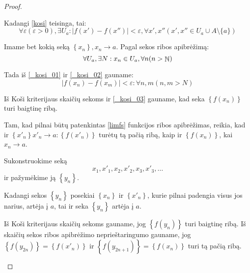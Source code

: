 \begin{prop}
\begin{proof}
\begin{description}
        Kadangi \ref{kosi} teisinga, tai:
        \begin{equation}
          \forall \varepsilon (\varepsilon > 0), \exists U_{a} :
          | f(x') - f(x'') | < \varepsilon, \forall x',x''
          (x',x'' \in U_{a} \cup A \setminus \{a\})
          \label{_kosi_01}
        \end{equation}

        Imame bet kokią seką $\left\{ x_{n} \right\}, x_{n} \to a$. Pagal
        sekos ribos apibrėžimą:
        \begin{equation}
          \forall U_{a}, \exists N : x_{n} \in U_{a}, \forall n (n > \mathop{\mathbb{N}})
          \label{_kosi_02}
        \end{equation}

        Tada iš \ref{_kosi_01} ir \ref{_kosi_02} gauname:
        \begin{equation}
          | f(x_{n}) - f(x_{m}) | < \varepsilon : \forall n, m (n,m > N)
          \label{_kosi_03}
        \end{equation}

        Iš Koši kriterijaus skaičių sekoms ir \ref{_kosi_03} gauname, kad
        seka $\left\{ f(x_{n}) \right\}$ turi baigtinę ribą.

        Tam, kad pilnai būtų patenkintas \ref{limfs} funkcijos ribos 
        apibrėžimas, reikia, kad ir 
        $\left\{ x'_{n} \right\} x'_{n} \to a : \left\{ f(x'_{n}) \right\}$
        turėtų tą pačią ribą, kaip ir $\left\{ f(x_{n}) \right\}$, 
        kai $x_{n} \to a$.

        Sukonstruokime seką
        \begin{equation*}
          x_{1},x'_{1},x_{2},x'_{2},x_{3},x'_{3},\ldots
        \end{equation*}
        ir pažymėkime ją $\left\{ y_{n} \right\}$.

        Kadangi sekos $\left\{ y_{n} \right\}$ posekiai 
        $\left\{ x_{n} \right\}$ ir $\left\{ x'_{n} \right\}$, kurie pilnai 
        padengia visus jos narius, artėja į $a$, tai ir seka 
        $\left\{ y_{n} \right\}$ artėja į $a$.

        Iš Koši kriterijaus skaičių sekoms gauname, jog 
        $\left\{ f(y_{n}) \right\}$ turi baigtinę ribą. Iš skaičių sekos
        ribos apibrėžimo neprieštaringumo gauname, jog 
        $\left\{ f(y_{2n}) \right\} = \left\{ f(x'_{n}) \right\}$ ir
        $\left\{ f(y_{2n+1}) \right\} = \left\{ f(x_{n}) \right\}$ turi tą
        pačią ribą.

    \end{description}
  \end{proof}
\end{prop}
